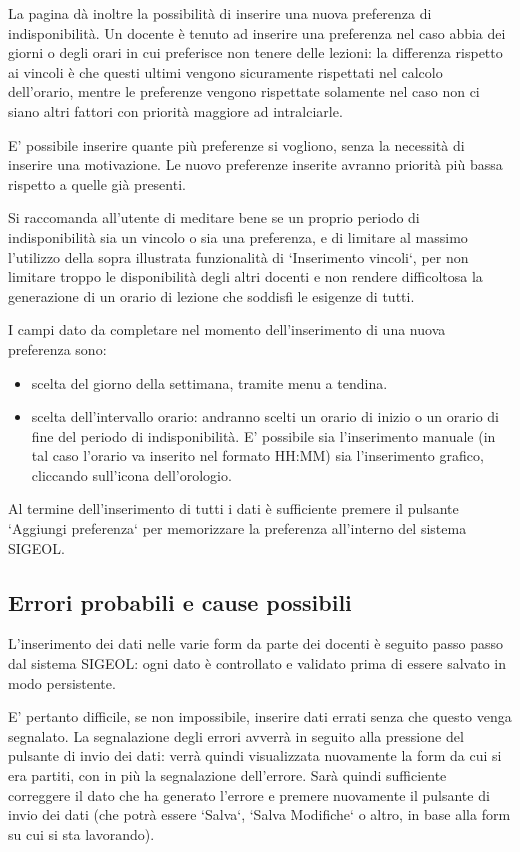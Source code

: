 \documentclass[11pt,a4paper]{article}
\begin{document}
La pagina dà inoltre la possibilità di inserire una nuova preferenza di indisponibilità.
Un docente è tenuto ad inserire una preferenza nel caso abbia dei giorni o degli orari in cui preferisce non tenere delle lezioni: la differenza rispetto ai vincoli è che questi ultimi vengono sicuramente rispettati nel calcolo dell'orario, mentre le preferenze vengono rispettate solamente nel caso non ci siano altri fattori con priorità maggiore ad intralciarle.

E' possibile inserire quante più preferenze si vogliono, senza la necessità di inserire una motivazione.
Le nuovo preferenze inserite avranno priorità più bassa rispetto a quelle già presenti.

Si raccomanda all'utente di meditare bene se un proprio periodo di indisponibilità sia un vincolo o sia una preferenza, e di limitare al massimo l'utilizzo della sopra illustrata funzionalità di `Inserimento vincoli`, per non limitare troppo le disponibilità degli altri docenti e non rendere difficoltosa la generazione di un orario di lezione che soddisfi le esigenze di tutti.

I campi dato da completare nel momento dell'inserimento di una nuova preferenza sono:
\begin{itemize}
 \item scelta del giorno della settimana, tramite menu a tendina.
 \item scelta dell'intervallo orario: andranno scelti un orario di inizio o un orario di fine del periodo di indisponibilità. E' possibile sia l'inserimento manuale (in tal caso l'orario va inserito nel formato HH:MM) sia l'inserimento grafico, cliccando sull'icona dell'orologio.
\end{itemize}
Al termine dell'inserimento di tutti i dati è sufficiente premere il pulsante `Aggiungi preferenza` per memorizzare la preferenza all'interno del sistema SIGEOL.

\subsection{Errori probabili e cause possibili}
L'inserimento dei dati nelle varie form da parte dei docenti è seguito passo passo dal sistema SIGEOL: ogni dato è controllato e validato prima di essere salvato in modo persistente.

E' pertanto difficile, se non impossibile, inserire dati errati senza che questo venga segnalato.
La segnalazione degli errori avverrà in seguito alla pressione del pulsante di invio dei dati: verrà quindi visualizzata nuovamente la form da cui si era partiti, con in più la segnalazione dell'errore. Sarà quindi sufficiente correggere il dato che ha generato l'errore e premere nuovamente il pulsante di invio dei dati (che potrà essere `Salva`, `Salva Modifiche` o altro, in base alla form su cui si sta lavorando).
\end{document}
